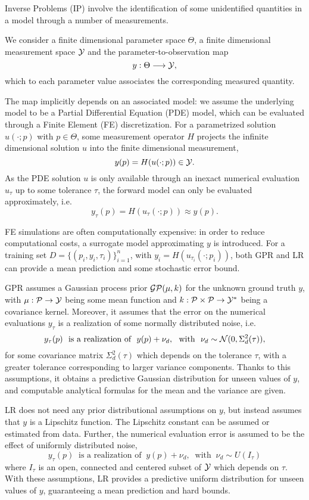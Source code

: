 Inverse Problems (IP) involve the identification of some unidentified quantities in a model through a number of measurements.

We consider a finite dimensional parameter space $\Theta$, a finite dimensional measurement space $ \mathcal Y$ and the parameter-to-observation map 
\[
 y : \Theta \longrightarrow \mathcal Y, 
\]
which to each parameter value associates the corresponding measured quantity.

The map implicitly depends on an associated model: we assume the underlying model to be a Partial Differential Equation (PDE) model, which can be evaluated through a Finite Element (FE) discretization.
For a parametrized solution $u(\cdot;p)$ with $p\in \Theta$, some measurement operator $H$ projects the infinite dimensional solution $u$ into the finite dimensional measurement, 
\[
    y (p) = H(u(\cdot;p)) \in \mathcal Y.
\]
As the PDE solution $u$ is only available through an inexact numerical evaluation $u_\tau$ up to some tolerance $\tau$, the forward model can only be evaluated approximately, i.e.
\[
    y_\tau (p) = H(u_\tau(\cdot;p)) \approx y(p).
\]

FE simulations are often computationally expensive: in order to reduce computational costs, a surrogate model approximating $y$ is introduced.
For a training set $D = \{(p_i,y_i,\tau_i)\}_{i=1}^n$, with $y_i = H(u_{\tau_i}(\cdot;p_i))$, both GPR and LR can provide a mean prediction and some stochastic error bound. 

GPR assumes a Gaussian process prior $\mathcal G \mathcal P (\mu, k)$ for the unknown ground truth $y$, with $\mu : \mathcal P \rightarrow \mathcal Y$ being some mean function and $k: \mathcal P \times \mathcal P \rightarrow \mathcal Y^* $ being a covariance kernel.
Moreover, it assumes that the error on the numerical evaluations $y_\tau$ is a realization of some normally distributed noise, i.e. 
\begin{equation}\label{eq:GPR-noise}
    y_\tau(p) \ \text{ is a realization of } \ y(p) + \nu_d,  \ \text{ with } \ \nu_d \sim \mathcal N (0, \Sigma_d^2(\tau)),    
\end{equation}
for some covariance matrix $\Sigma_d^2(\tau)$ which depends on the tolerance $\tau$, with a greater tolerance corresponding to larger variance components.
Thanks to this assumptions, it obtains a predictive Gaussian distribution for unseen values of $y$, and computable analytical formulas for the mean and the variance are given.

LR does not need any prior distributional assumptions on $y$, but instead assumes that $y$ is a Lipschitz function.
The Lipschitz constant can be assumed or estimated from data.
Further, the numerical evaluation error is assumed to be the effect of uniformly distributed noise,  
\begin{equation}\label{eq:LR-noise}
    y_\tau(p) \ \text{ is a realization of } \ y(p) + \nu_d,  \ \text{ with } \ \nu_d \sim U(I_\tau )    
\end{equation}
where $I_\tau$ is an open, connected and centered subset of $\mathcal Y$ which depends on $\tau$.
With these assumptions, LR provides a predictive uniform distribution for unseen values of $y$, guaranteeing a mean prediction and hard bounds.\medskip

